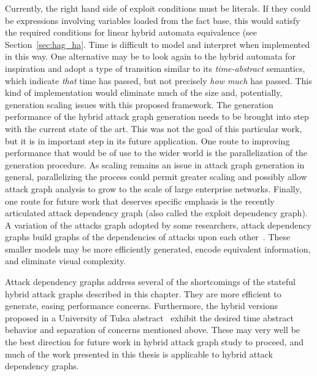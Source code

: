 Currently, the right hand side of exploit conditions must be literals. If they
could be expressions involving variables loaded from the fact base, this would 
satisfy the required conditions for linear hybrid automata equivalence (see
Section~\ref{sec:hag_ha}.
Time is difficult to model and interpret when implemented in this way. One
alternative may be to look again to the hybrid automata for inspiration and
adopt a type of transition similar to its \emph{time-abstract} semantics,
which indicate \emph{that} time has passed, but not precisely \emph{how much}
has passed. This kind of implementation would eliminate much of the size and,
potentially, generation scaling issues with this proposed framework.
The generation performance of the hybrid attack graph generation needs to be
brought into step with the current state of the art. This was not the goal of
this particular work, but it is in important step in its future application.
One route to improving performance that would be of use to the wider world is
the parallelization of the generation procedure. As scaling remains an issue
in attack graph generation in general, parallelizing the process could permit
greater scaling and possibly allow attack graph analysis to grow to the scale
of large enterprise networks.
Finally, one route for future work that deserves specific emphasis is the recently
articulated attack dependency graph (also called the exploit dependency graph).
A variation of the attacks graph adopted by some researchers, attack dependency
graphs build graphs of the dependencies of attacks upon each 
other~\cite{jajodia2005topological, noel2004managing}. These smaller models may
be more efficiently generated, encode equivalent information, and eliminate 
visual complexity.

Attack dependency graphs address several of the shortcomings of the stateful
hybrid attack graphs described in this chapter. They are more efficient to
generate, easing performance concerns. Furthermore, the hybrid versions proposed
in a University of Tulsa abstract~\cite{louthan2011toward} exhibit the
desired time abstract behavior and separation of concerns mentioned above. These
may very well be the best direction for future work in hybrid attack graph
study to proceed, and much of the work presented in this thesis is applicable to
hybrid attack dependency graphs.
